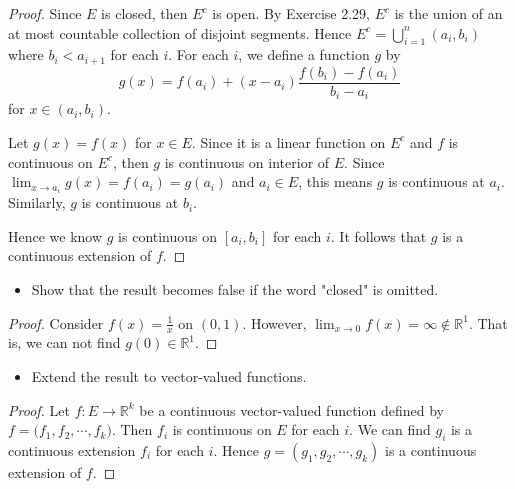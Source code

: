 \begin{Exercise}
	\begin{proof}
		Since $E$ is closed, then $E^c$ is open.
		By Exercise 2.29, $E^c$ is the union of an at most countable collection of disjoint segments.
		Hence $E^c = \bigcup_{i=1}^{n}(a_i,b_i)$ where $b_i < a_{i+1}$ for each $i$.
		For each $i$, we define a function $g$ by
		$$
		g(x) = f(a_i) + (x-a_i)\frac{f(b_i)-f(a_i)}{b_i-a_i}
		$$
		for $x\in(a_i,b_i)$.
		
		Let $g(x) = f(x)$ for $x\in E$.
		Since it is a linear function on $E^c$ and $f$ is continuous on $E^c$, then $g$ is continuous on interior of $E$.
		Since $\lim_{x\to a_i} g(x) = f(a_i) = g(a_i)$ and $a_i\in E$, this means $g$ is continuous at $a_i$.
		Similarly, $g$ is continuous at $b_i$.
		
		Hence we know $g$ is continuous on $[a_i,b_i]$ for each $i$.
		It follows that $g$ is a continuous extension of $f$.
	\end{proof}
	
	\begin{itemize}
		\item Show that the result becomes false if the word "closed" is omitted.
	\end{itemize}
	\begin{proof}
		Consider $f(x) = \frac{1}{x}$ on $(0,1)$.
		However, $\lim_{x\to 0}f(x) = \infty \notin \mathbb{R}^1$.
		That is, we can not find $g(0)\in \mathbb{R}^1$.
	\end{proof}
	
	\begin{itemize}
		\item Extend the result to vector-valued functions.
	\end{itemize}
	\begin{proof}
		Let $f:E\to\mathbb{R}^k$ be a continuous vector-valued function defined by $f = \big( f_1, f_2, \cdots, f_k)$.
		Then $f_i$ is continuous on $E$ for each $i$.
		We can find $g_i$ is a continuous extension $f_i$ for each $i$.
		Hence $g = (g_1,g_2,\cdots,g_k)$ is a continuous extension of $f$.
	\end{proof}
\end{Exercise}